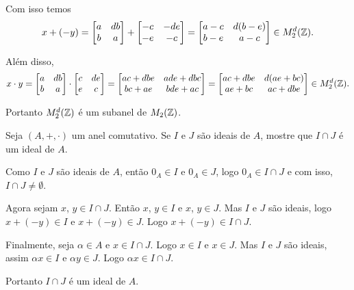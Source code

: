 \documentclass[12pt]{exam}
\begin{document}
    Com isso temos
    \begin{align*}
        x + (-y) = \begin{bmatrix}
            a & db\\b & a
        \end{bmatrix} + \begin{bmatrix}
        -c & -de\\-e & -c
        \end{bmatrix} = \begin{bmatrix}
        a - c & d(b - e)\\b - e & a - c
        \end{bmatrix} \in M_2^d(\mathbb{Z}).
    \end{align*}

    Além disso,
    \begin{align*}
        x \cdot y = \begin{bmatrix}
            a & db\\b & a
        \end{bmatrix} \cdot \begin{bmatrix}
            c & de\\e & c
        \end{bmatrix} = \begin{bmatrix}
            ac + dbe & ade + dbc\\bc + ae & bde + ac
        \end{bmatrix} = \begin{bmatrix}
            ac + dbe & d(ae + bc)\\ae + bc & ac + dbe
        \end{bmatrix} \in M_2^d(\mathbb{Z}).
    \end{align*}

    Portanto $M_2^d(\mathbb{Z})$ é um subanel de $M_2(\mathbb{Z})$.

    \vspace{.4cm}

    \questao Seja $(A, +, \cdot)$ um anel comutativo. Se $I$ e $J$ são ideais de $A$, mostre que $I \cap J$ é um ideal de $A$.

    \solucao \noindent Como $I$ e $J$ são ideais de $A$, então $0_A \in I$ e $0_A \in J$, logo $0_A \in I \cap J$ e com isso, $I \cap J \ne \emptyset$.

    Agora sejam $x$, $y \in I \cap J$. Então $x$, $y \in I$ e $x$, $y \in J$. Mas $I$ e $J$ são ideais, logo $x + (-y) \in I$ e $x + (-y) \in J$. Logo $x + (-y) \in I \cap J$.

    Finalmente, seja $\alpha \in A$ e $x \in I \cap J$. Logo $x \in I$ e $x \in J$. Mas $I$ e $J$ são ideais, assim $\alpha x \in I$ e $\alpha y \in J$. Logo $\alpha x \in I \cap J$.

    Portanto $I \cap J$ é um ideal de $A$.
    \vspace{1cm}
\end{document}
